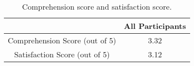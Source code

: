 \begin{table}[H]
\centering
{}
\caption{The $p$-values of comparing confidence values between interaction rounds. Specifically, $p_{i,j}$ indicates the $p$-value for the hypothesis that the confidence increases from round $i$ to round $j$. }
\label{table:t-test_confidence}
\end{table}

\begin{table}[H]
\centering \small
\begin{tabular}{cc}
\toprule[2pt]
                               & All Participants \\ \midrule[2pt]
Comprehension Score (out of 5) & 3.32             \\ [1ex]
Satisfaction Score (out of 5)  & 3.12             \\ \bottomrule[2pt]
\end{tabular}
\caption{Comprehension score and satisfaction score.}
\label{table:comprehension_and_satisfaction}
\end{table}
